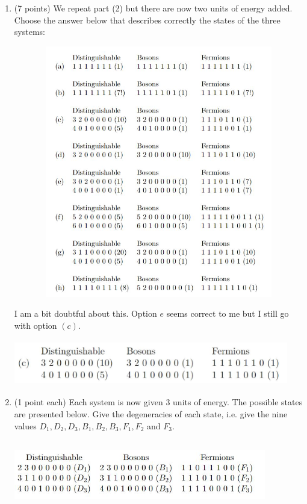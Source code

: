 \documentclass[fleqn]{article}
\begin{document}
\begin{enumerate}
    \item (7 points) We repeat part (2) but there are now two units of energy added. Choose the answer
    below that describes correctly the states of the three systems:
    \begin{center}
      \includegraphics[height=11cm, width=15cm]{3.JPG}
    \end{center}

      \textcolor{hwColor}{
        I am  a bit doubtful about this. Option $e$ seems correct to me but I still go with option $(c)$.
      }
      \begin{center}
        \includegraphics[height=2cm, width=12cm]{Answer3.JPG}
      \end{center}

    \pagebreak

    \item (1 point each) Each system is now given $3$ units of energy. The possible states are presented
    below. Give the degeneracies of each state, i.e. give the nine values $D_1, D_2, D_3, B_1, B_2, B_3,
    F_1, F_2$ and $F_3$.
    \begin{center}
      \includegraphics[height=3cm, width=11cm]{4.JPG}
    \end{center}


\end{enumerate}
\end{document}

